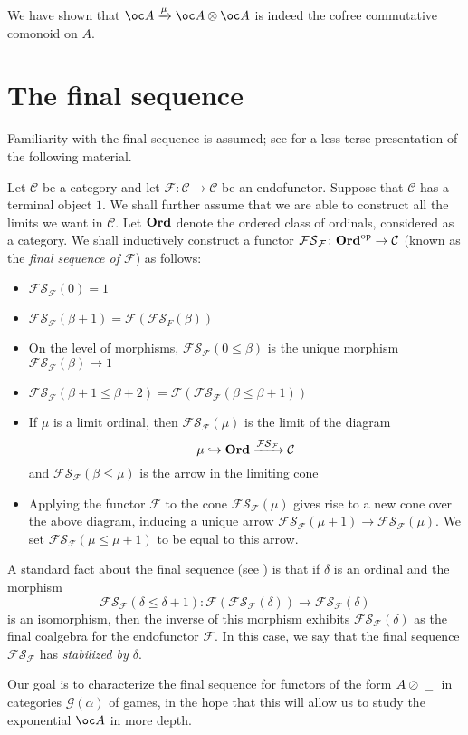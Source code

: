 \documentclass[11pt]{article} %
\theoremstyle{plain} %
\theoremstyle{definition} %
\theoremstyle{note}
\theoremstyle{exercisestyle}
\newcommand{\catname}[1]{{\normalfont\textbf{#1}}}
\newcommand*\from{\colon}
\newcommand\oppcat[1]{#1^{\mathrm{op}}}
\newcommand{\tensor}{\otimes}
\newcommand{\sequoid}{\oslash}
\newcommand{\G}{\mathcal G}
\newcommand{\F}{\mathcal F}
\newcommand{\blank}{\;\underline{\hspace{1.5ex}}\;}
\newcommand{\C}{{\mathcal{C}}}
\newcommand{\Ord}{\catname{Ord}}
\newcommand{\FS}{\mathcal{FS}}
\begin{document}
We have shown that $\oc A \xrightarrow{\mu}\oc A \tensor \oc A$ is indeed the cofree commutative comonoid on $A$.  

\section{The final sequence}

Familiarity with the final sequence is assumed; see \cite{finalseq} for a less terse presentation of the following material.

Let $\C$ be a category and let $\F\from \C\to \C$ be an endofunctor.  Suppose that $\C$ has a terminal object $1$.  We shall further assume that we are able to construct all the limits we want in $\C$.  Let $\Ord$ denote the ordered class of ordinals, considered as a category.  We shall inductively construct a functor $\FS_\F\from\oppcat\Ord\to\C$ (known as the \emph{final sequence of $\F$}) as follows:

\begin{itemize}
  \item $\FS_\F(0)=1$
  \item $\FS_\F(\beta+1) =\F\left(\FS_F(\beta)\right)$
  \item On the level of morphisms, $\FS_\F(0\le\beta)$ is the unique morphism $\FS_\F(\beta)\to 1$
  \item $\FS_\F(\beta+1\le\beta+2)=\F(\FS_\F(\beta\le\beta+1))$
  \item If $\mu$ is a limit ordinal, then $\FS_\F(\mu)$ is the limit of the diagram
    \[
      \mu\hookrightarrow\Ord\xrightarrow{\FS_\F}\C
      \]
    and $\FS_\F(\beta\le\mu)$ is the arrow in the limiting cone
  \item Applying the functor $\F$ to the cone $\FS_\F(\mu)$ gives rise to a new cone over the above diagram, inducing a unique arrow $\FS_\F(\mu+1)\to\FS_\F(\mu)$.  We set $\FS_\F(\mu\le\mu+1)$ to be equal to this arrow.
\end{itemize}

A standard fact about the final sequence (see \cite{finalseq}) is that if $\delta$ is an ordinal and the morphism
\[
  \FS_\F(\delta\le\delta+1)\from \F(\FS_\F(\delta))\to \FS_\F(\delta)
  \]
is an isomorphism, then the inverse of this morphism exhibits $\FS_\F(\delta)$ as the final coalgebra for the endofunctor $\F$.  In this case, we say that the final sequence $\FS_\F$ has \emph{stabilized by $\delta$}.  

Our goal is to characterize the final sequence for functors of the form $A\sequoid\blank$ in categories $\G(\alpha)$ of games, in the hope that this will allow us to study the exponential $\oc A$ in more depth.
\end{document}
